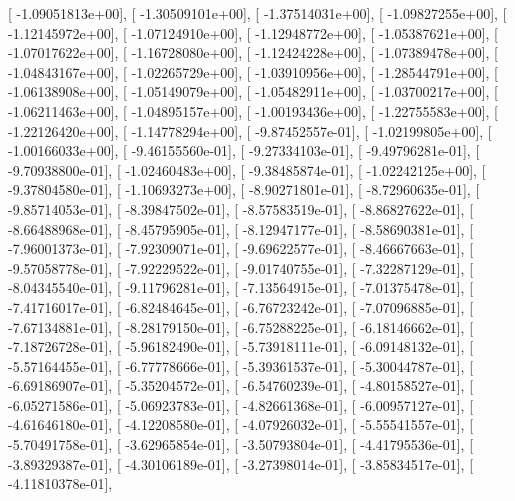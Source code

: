 \documentclass{article}
\begin{document}
       [ -1.09051813e+00],
       [ -1.30509101e+00],
       [ -1.37514031e+00],
       [ -1.09827255e+00],
       [ -1.12145972e+00],
       [ -1.07124910e+00],
       [ -1.12948772e+00],
       [ -1.05387621e+00],
       [ -1.07017622e+00],
       [ -1.16728080e+00],
       [ -1.12424228e+00],
       [ -1.07389478e+00],
       [ -1.04843167e+00],
       [ -1.02265729e+00],
       [ -1.03910956e+00],
       [ -1.28544791e+00],
       [ -1.06138908e+00],
       [ -1.05149079e+00],
       [ -1.05482911e+00],
       [ -1.03700217e+00],
       [ -1.06211463e+00],
       [ -1.04895157e+00],
       [ -1.00193436e+00],
       [ -1.22755583e+00],
       [ -1.22126420e+00],
       [ -1.14778294e+00],
       [ -9.87452557e-01],
       [ -1.02199805e+00],
       [ -1.00166033e+00],
       [ -9.46155560e-01],
       [ -9.27334103e-01],
       [ -9.49796281e-01],
       [ -9.70938800e-01],
       [ -1.02460483e+00],
       [ -9.38485874e-01],
       [ -1.02242125e+00],
       [ -9.37804580e-01],
       [ -1.10693273e+00],
       [ -8.90271801e-01],
       [ -8.72960635e-01],
       [ -9.85714053e-01],
       [ -8.39847502e-01],
       [ -8.57583519e-01],
       [ -8.86827622e-01],
       [ -8.66488968e-01],
       [ -8.45795905e-01],
       [ -8.12947177e-01],
       [ -8.58690381e-01],
       [ -7.96001373e-01],
       [ -7.92309071e-01],
       [ -9.69622577e-01],
       [ -8.46667663e-01],
       [ -9.57058778e-01],
       [ -7.92229522e-01],
       [ -9.01740755e-01],
       [ -7.32287129e-01],
       [ -8.04345540e-01],
       [ -9.11796281e-01],
       [ -7.13564915e-01],
       [ -7.01375478e-01],
       [ -7.41716017e-01],
       [ -6.82484645e-01],
       [ -6.76723242e-01],
       [ -7.07096885e-01],
       [ -7.67134881e-01],
       [ -8.28179150e-01],
       [ -6.75288225e-01],
       [ -6.18146662e-01],
       [ -7.18726728e-01],
       [ -5.96182490e-01],
       [ -5.73918111e-01],
       [ -6.09148132e-01],
       [ -5.57164455e-01],
       [ -6.77778666e-01],
       [ -5.39361537e-01],
       [ -5.30044787e-01],
       [ -6.69186907e-01],
       [ -5.35204572e-01],
       [ -6.54760239e-01],
       [ -4.80158527e-01],
       [ -6.05271586e-01],
       [ -5.06923783e-01],
       [ -4.82661368e-01],
       [ -6.00957127e-01],
       [ -4.61646180e-01],
       [ -4.12208580e-01],
       [ -4.07926032e-01],
       [ -5.55541557e-01],
       [ -5.70491758e-01],
       [ -3.62965854e-01],
       [ -3.50793804e-01],
       [ -4.41795536e-01],
       [ -3.89329387e-01],
       [ -4.30106189e-01],
       [ -3.27398014e-01],
       [ -3.85834517e-01],
       [ -4.11810378e-01],
\end{document}
